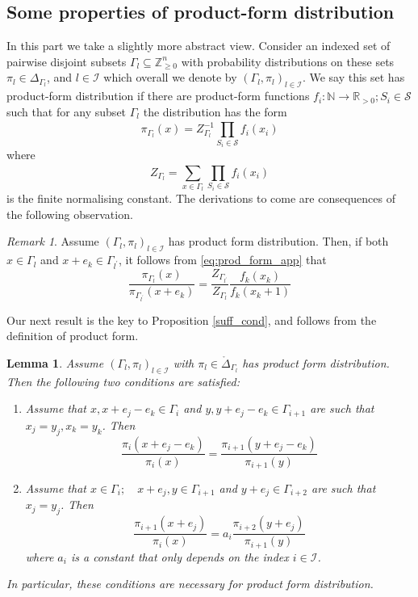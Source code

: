\documentclass{amsart}
\newtheorem{lemma}[theorem]{Lemma}
\theoremstyle{definition}
\theoremstyle{remark}
\newtheorem{remark}[theorem]{Remark}
\theoremstyle{Conjecture/open problem}
\theoremstyle{assumption}
\theoremstyle{conjecture}
\def\I{\mathcal{I}}
\def\Ga{\Gamma}
\def\p{^{\prime}}
\def\cS{\mathcal{S}}
\def\R{\mathbb{R}}
\def\N{\mathbb{N}}
\def\Z{\mathbb{Z}}
\numberwithin{equation}{section}
\begin{document}
\subsection{Some properties of product-form distribution}\label{app_prod_f}
\hfill\break
In this part we take a slightly more abstract view. Consider an indexed set of pairwise disjoint subsets $\Ga_l\subseteq \Z_{\geq 0}^n$ with probability distributions on these sets $\pi_l\in \Delta_{\Ga_l}$, and $l\in\I$
which overall we denote by $(\Ga_l,\pi_l)_{l\in \mathcal{I}}$. We say this set has product-form distribution if there are product-form functions $f_i: \N\to \R_{>0}; S_i\in \cS$ such that for any subset $\Ga_l$ the distribution has the form
\begin{equation}\label{eq:prod_form_app}\pi_{\Ga_l}(x)=Z_{\Ga_l}^{-1}\prod_{S_i\in\cS}^{ } f_i(x_i)\end{equation}
where $$Z_{\Ga_l}=\sum_{x\in \Ga_l}\prod_{S_i\in\cS}^{ } f_i(x_i)$$ is the finite normalising constant.
The derivations to come are consequences of the  following observation.
\begin{remark}\label{basic_rem}
Assume $(\Ga_l,\pi_l)_{l\in \mathcal{I}}$ has product form distribution. Then, if both $x\in \Ga_l$ and $x+e_k\in \Ga_{l\p}$, it follows from \eqref{eq:prod_form_app} that
\begin{equation}\label{basic_prod} \frac{\pi_{\Ga_l}(x)}{\pi_{\Ga_{l\p}}(x+e_k)}=\frac{Z_{\Ga_{l\p}}}{Z_{\Ga_l}}\frac{f_k(x_k)}{f_k(x_k+1)}\end{equation}
\end{remark}
Our next result is the key to Proposition \ref{suff_cond}, and follows from the definition of product form. 
\begin{lemma} \label{Lemma_nec}
Assume $(\Ga_l,\pi_l)_{l\in \mathcal{I}}$ with $\pi_l\in \mathring\Delta_{\Ga_l}$ has product form distribution. Then the following two conditions are satisfied:
\begin{enumerate}
\item[(a)]\label{a} Assume that $x,x+e_j-e_k\in \Ga_i$ and $y,y+e_j-e_k\in \Ga_{i+1}$ are such that $x_j=y_j,x_k=y_k$. Then
$$\frac{\pi_{i}(x+e_j-e_k)}{\pi_i(x)}=\frac{\pi_{i+1}(y+e_j-e_k)}{\pi_{i+1}(y)}$$
\item[(b)] Assume that $x\in \Ga_i;\quad x+e_j,y\in \Ga_{i+1}$ and $y+e_j\in \Ga_{i+2}$ are such that $x_j=y_j$. Then
$$\frac{\pi_{i+1}(x+e_j)}{\pi_i(x)}=a_i\frac{\pi_{i+2}(y+e_j)}{\pi_{i+1}(y)}$$
where $a_i$  is a constant that only depends on the index $i\in \mathcal{I}$.
\end{enumerate}
In particular, these conditions are necessary for product form distribution.
\end{lemma}
\end{document}
